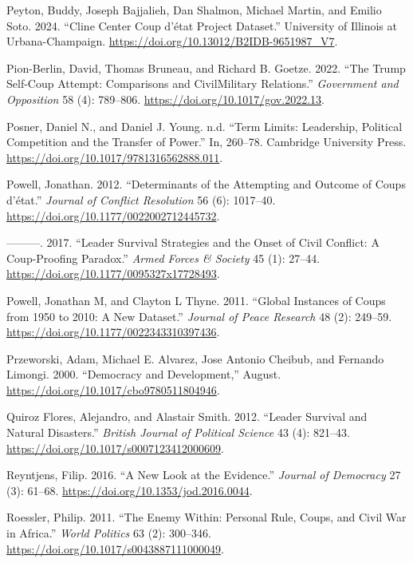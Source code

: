 \documentclass[
  12pt,
]{report}
\newlength{\cslhangindent}
\newenvironment{CSLReferences}[2] %
 {\begin{list}{}{%
  \setlength{\itemindent}{0pt}
  \setlength{\leftmargin}{0pt}
  \setlength{\parsep}{0pt}
  \ifodd #1
   \setlength{\leftmargin}{\cslhangindent}
   \setlength{\itemindent}{-1\cslhangindent}
  \fi
  \setlength{\itemsep}{#2\baselineskip}}}
 {\end{list}}
\begin{document}
\begin{CSLReferences}{1}{0}
Peyton, Buddy, Joseph Bajjalieh, Dan Shalmon, Michael Martin, and Emilio
Soto. 2024. {``Cline Center Coup d{'}état Project Dataset.''} University
of Illinois at Urbana-Champaign.
\url{https://doi.org/10.13012/B2IDB-9651987_V7}.

Pion-Berlin, David, Thomas Bruneau, and Richard B. Goetze. 2022. {``The
Trump Self-Coup Attempt: Comparisons and Civil{\textendash}Military
Relations.''} \emph{Government and Opposition} 58 (4): 789--806.
\url{https://doi.org/10.1017/gov.2022.13}.

Posner, Daniel N., and Daniel J. Young. n.d. {``Term Limits: Leadership,
Political Competition and the Transfer of Power.''} In, 260--78.
Cambridge University Press.
\url{https://doi.org/10.1017/9781316562888.011}.

Powell, Jonathan. 2012. {``Determinants of the Attempting and Outcome of
Coups d{'}état.''} \emph{Journal of Conflict Resolution} 56 (6):
1017--40. \url{https://doi.org/10.1177/0022002712445732}.

---------. 2017. {``Leader Survival Strategies and the Onset of Civil
Conflict: A Coup-Proofing Paradox.''} \emph{Armed Forces \& Society} 45
(1): 27--44. \url{https://doi.org/10.1177/0095327x17728493}.

Powell, Jonathan M, and Clayton L Thyne. 2011. {``Global Instances of
Coups from 1950 to 2010: A New Dataset.''} \emph{Journal of Peace
Research} 48 (2): 249--59.
\url{https://doi.org/10.1177/0022343310397436}.

Przeworski, Adam, Michael E. Alvarez, Jose Antonio Cheibub, and Fernando
Limongi. 2000. {``Democracy and Development,''} August.
\url{https://doi.org/10.1017/cbo9780511804946}.

Quiroz Flores, Alejandro, and Alastair Smith. 2012. {``Leader Survival
and Natural Disasters.''} \emph{British Journal of Political Science} 43
(4): 821--43. \url{https://doi.org/10.1017/s0007123412000609}.

Reyntjens, Filip. 2016. {``A New Look at the Evidence.''} \emph{Journal
of Democracy} 27 (3): 61--68.
\url{https://doi.org/10.1353/jod.2016.0044}.

Roessler, Philip. 2011. {``The Enemy Within: Personal Rule, Coups, and
Civil War in Africa.''} \emph{World Politics} 63 (2): 300--346.
\url{https://doi.org/10.1017/s0043887111000049}.


\end{CSLReferences}
\end{document}
